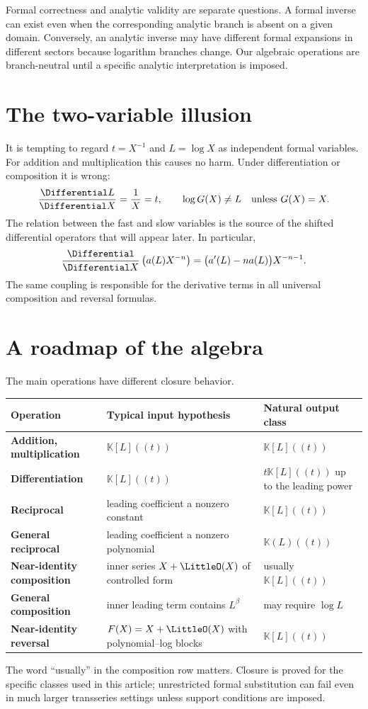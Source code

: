 \documentclass[11pt,openany]{book}
\theoremstyle{definition}
\theoremstyle{plain}
\theoremstyle{remark}
\newcommand{\K}{\mathbb{K}}
\begin{document}
\begin{warningbox}
Formal correctness and analytic validity are separate questions.  A formal
inverse can exist even when the corresponding analytic branch is absent on a
given domain.  Conversely, an analytic inverse may have different formal
expansions in different sectors because logarithm branches change.  Our
algebraic operations are branch-neutral until a specific analytic
interpretation is imposed.
\end{warningbox}

\section{The two-variable illusion}
It is tempting to regard \(t=X^{-1}\) and \(L=\log X\) as independent formal
variables.  For addition and multiplication this causes no harm.  Under
differentiation or composition it is wrong:
\[
 \frac{\Differential L}{\Differential X}=\frac1X=t,
 \qquad
 \log G(X)\ne L\quad\text{unless }G(X)=X.
\]
The relation between the fast and slow variables is the source of the shifted
differential operators that will appear later.  In particular,
\begin{equation}\label{eq:derivative-preview}
 \frac{\Differential}{\Differential X}\left(a(L)X^{-n}\right)
 =\bigl(a'(L)-n a(L)\bigr)X^{-n-1}.
\end{equation}
The same coupling is responsible for the derivative terms in all universal
composition and reversal formulas.

\section{A roadmap of the algebra}
The main operations have different closure behavior.
\begin{center}
\begin{tabularx}{0.95\textwidth}{@{}>{\bfseries}l X X@{}}
\toprule
Operation & Typical input hypothesis & Natural output class \\
\midrule
Addition, multiplication & \(\K[L]((t))\) & \(\K[L]((t))\) \\
Differentiation & \(\K[L]((t))\) & \(t\K[L]((t))\) up to the leading power \\
Reciprocal & leading coefficient a nonzero constant & \(\K[L]((t))\) \\
General reciprocal & leading coefficient a nonzero polynomial & \(\K(L)((t))\) \\
Near-identity composition & inner series \(X+\LittleO(X)\) of controlled form & usually \(\K[L]((t))\) \\
General composition & inner leading term contains \(L^\beta\) & may require \(\log L\) \\
Near-identity reversal & \(F(X)=X+\LittleO(X)\) with polynomial--log blocks & \(\K[L]((t))\) \\
\bottomrule
\end{tabularx}
\end{center}
The word ``usually'' in the composition row matters.  Closure is proved for the
specific classes used in this article; unrestricted formal substitution can
fail even in much larger transseries settings unless support conditions are
imposed.
\end{document}
